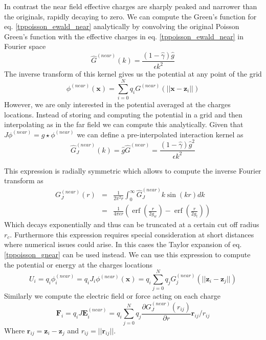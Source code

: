 \documentclass[ twoside,openright,titlepage,numbers=noenddot,%
headinclude,footinclude,cleardoublepage=empty,abstract=on,
BCOR=5mm,paper=a4,fontsize=11pt
]{scrreprt}
\renewcommand{\vec}[1]{\bm{#1}}
\DeclareMathOperator{\erf}{erf}
\begin{document}
In contrast the near field effective charges are sharply peaked and narrower than the originals, rapidly decaying to zero. We can compute the Green's function for eq. \eqref{tppoisson_ewald_near} analytically by convolving the original Poisson Green's function with the effective charges in eq. \eqref{tppoisson_ewald_near} in Fourier space
\begin{equation}
  \hat{G}^{(near)}(k) = \frac{(1-\hat{\gamma})\hat{g}}{\epsilon k^2}
\end{equation}
The inverse transform of this kernel gives us the potential at any point of the grid 
\begin{equation}
  \phi^{(near)}(\vec{x}) = \sum_{i=0}^N{q_iG^{(near)}(||\vec{x}-\vec{z}_i||)}
\end{equation}
However, we are only interested in the potential averaged at the charges locations. Instead of storing and computing the potential in a grid and then interpolating as in the far field we can compute this analytically. Given that $J \phi^{(near)} = g\star \phi^{(near)}$ we can define a pre-interpolated interaction kernel as
\begin{equation}
  \hat{G}_J^{(near)}(k) = \hat{g}\hat{G}^{(near)} = \frac{(1-\hat{\gamma})\hat{g}^2}{\epsilon k^2}
\end{equation}

This expression is radially symmetric which allows to compute the inverse Fourier transform as
\begin{eqnarray}
  \label{tppoisson_gnear}
  G_J^{(near)}(r) &=& \frac{1}{2\pi^2r}\int_0^\infty{\hat{G}^{(near)}_Jk \sin(kr)dk}\nonumber \\
            &=& \frac{1}{4\pi\epsilon r}\left(\erf\left(\frac{r}{2g_w}\right) - \erf\left(\frac{r}{2g_t}\right)\right)
\end{eqnarray}
Which decays exponentially and thus can be truncated at a certain cut off radius $r_c$. Furthermore this expression requires special consideration at short distances where numerical issues could arise. In this cases the Taylor expansion of eq. \eqref{tppoisson_gnear} can be used instead.
We can use this expression to compute the potential or energy at the charges locations
\begin{equation}
  U_i = q_i\phi^{(near)}_i = q_iJ_i\phi^{(near)}(\vec{x}) = q_i\sum_{j=0}^N{q_jG_j^{(near)}(||\vec{z}_i - \vec{z}_j||)}
\end{equation}
Similarly we compute the electric field or force acting on each charge 
\begin{equation}
  \vec{F}_i = q_i J \vec{E}^{(near)}_i = q_i\sum_{j=0}^N{q_j\frac{\partial G_J^{(near)}(r_{ij})}{\partial r}\vec{r}_{ij}/r_{ij}}
\end{equation}
Where $\vec{r}_{ij} = \vec{z}_i - \vec{z}_j$ and $r_{ij} = ||\vec{r}_{ij}||$.
\end{document}
